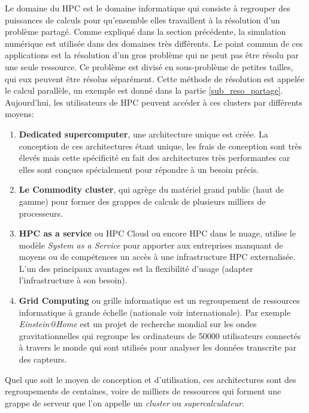 Le domaine du HPC est le domaine informatique qui consiste à regrouper des puissances de calculs pour qu'ensemble elles travaillent à la résolution d'un problème partagé. Comme expliqué dans la section précédente, la simulation numérique est utilisée dans des domaines très différents. Le point commun de ces applications est la résolution d'un gros problème qui ne peut pas être résolu par une seule ressource. Ce problème est divisé en sous-problème de petites tailles, qui eux peuvent être résolus séparément. Cette méthode de résolution est appelée le calcul parallèle, un exemple est donné dans la partie \ref{sub_reso_partage}. Aujourd'hui, les utilisateurs de HPC peuvent accéder à ces clusters par différents moyens:
\begin{enumerate}
\item \textbf{Dedicated supercomputer}, une architecture unique est créée. La conception de ces architectures étant unique, les frais de conception sont très élevés mais cette spécificité en fait des architectures très performantes car elles sont conçues spécialement pour répondre à un besoin précis. 
\item \textbf{Le Commodity cluster}, qui agrège du matériel grand public (haut de gamme) pour former des grappes de calculs de plusieurs milliers de processeurs.
\item \textbf{HPC as a service} ou HPC Cloud ou encore HPC dans le nuage,  utilise le modèle \textit{System as a Service} pour apporter aux entreprises manquant de moyens ou de compétences un accès à une infrastructure HPC externalisée. L'un des principaux avantages est la flexibilité d'usage (adapter l'infrastructure à son besoin). 
\item \textbf{Grid Computing} ou grille informatique est un regroupement de ressources informatique à grande échelle (nationale voir internationale). Par exemple \textit{Einstein@Home} \cite{PhysRevD.80.042003} est un projet de recherche mondial sur les ondes gravitationnelles  qui regroupe les ordinateurs de 50000 utilisateurs connectés à travers le monde qui sont utilisés pour  analyser les données transcrite par des capteurs.
\end{enumerate}


Quel que soit le moyen de conception et d'utilisation, ces architectures sont des regroupements de centaines, voire de milliers de ressources qui forment une grappe de serveur que l'on appelle un \textit{cluster} ou \textit{supercalculateur}. 

